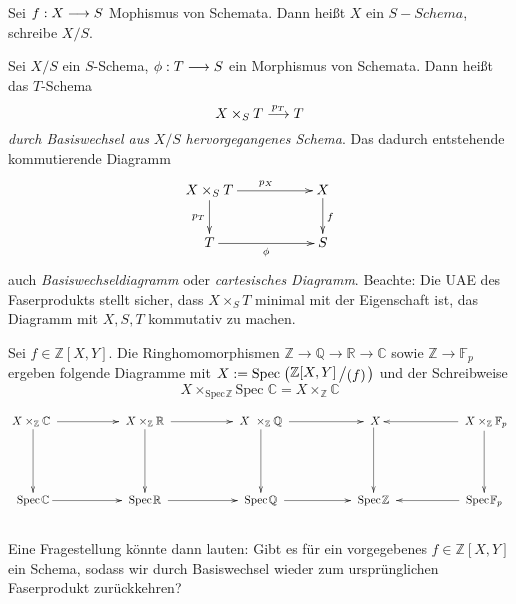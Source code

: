 \documentclass[11pt]{book}
\theoremstyle{nonumberbreak}
\newenvironment{defin}[1][]{\ifthenelse{\equal{#1}{}}{\definition}{\definition[#1]}\rm}{\enddefinition}
\newenvironment{ex}[1][]{\ifthenelse{\equal{#1}{}}{\example}{\example[#1]}\rm}{\endexample}
\newcommand{\spec}{\mathrm{Spec} \hspace{1pt} }
\newcommand{\slant}[2]{{\raisebox{.1em}{$#1$}\left/\raisebox{-.1em}{$#2$}\right.}}
\begin{document}
\begin{spacing}{1.4}
\begin{defin}  %
\begin{compactenum}
\item Sei $f: X \longrightarrow S$ Mophismus von Schemata. Dann heißt $X$ ein $S-Schema$, schreibe $X/S$.
\item Sei $X/S$ ein $S$-Schema, $\phi: T \longrightarrow S$ ein Morphismus von Schemata. Dann heißt das $T$-Schema
$$X \times_S T \overset{p_T}{\longrightarrow} T$$
\textit{durch Basiswechsel aus} $X/S$ \textit{hervorgegangenes Schema}. Das dadurch entstehende kommutierende Diagramm
$$
\begin{xy}
\xymatrix{
 X \times_S T \ar[rr]^{p_X} \ar[d]_{p_T}&& X \ar[d]^{f} \\
 T \ar[rr]_{\phi} && S
}
\end{xy}
$$
auch \textit{Basiswechseldiagramm} oder \textit{cartesisches Diagramm}. Beachte: Die UAE des Faserprodukts stellt sicher, dass $X \times_S T$ minimal mit der Eigenschaft ist, das Diagramm mit $X,S,T$ kommutativ zu machen.

\end{compactenum}

\end{defin}

\begin{ex}
Sei $f \in \mathbb{Z}[X,Y]$. Die Ringhomomorphismen $\mathbb{Z} \rightarrow \mathbb{Q} \rightarrow \mathbb{R} \rightarrow \mathbb{C}$ sowie $\mathbb{Z} \rightarrow \mathbb{F}_p$ ergeben folgende Diagramme mit $X:= \spec \left( \slant{\mathbb{Z}[X,Y]}{( f)} \right)$ und der Schreibweise
$$X \times_{\spec \mathbb{Z}} \spec \ \mathbb{C} = X \times_{\mathbb{Z}} \mathbb{C}$$

$$
\begin{xy}
\xymatrix{
X \times_{\mathbb{Z}} \mathbb{C} \ \ar[rr] \ar[dd]&&\ X \times_{\mathbb{Z}} \mathbb{R} \ \ar[rr] \ar[dd]&&\ X \ \times_{\mathbb{Z}} \mathbb{Q}\ \ar[rr]\ar[dd] &&\ X \ar[dd] && \ X \times_{\mathbb{Z}} \mathbb{F}_p \ar[ll] \ar[dd]\\
&&&&&&&& \\
\spec \mathbb{C} \ar[rr]&& \ \spec \mathbb{R} \ \ar[rr] &&\ \spec \mathbb{Q} \ \ar[rr]&&\ \spec \mathbb{Z} \ &&\ \spec \mathbb{F}_p\ \ar[ll]
}
\end{xy}
$$
\textrm{ } \\
Eine Fragestellung könnte dann lauten: Gibt es für ein vorgegebenes $f \in \mathbb{Z}[X,Y]$ ein Schema, sodass wir durch Basiswechsel wieder zum ursprünglichen Faserprodukt zurückkehren?

\end{ex}




\end{spacing}
\end{document}
